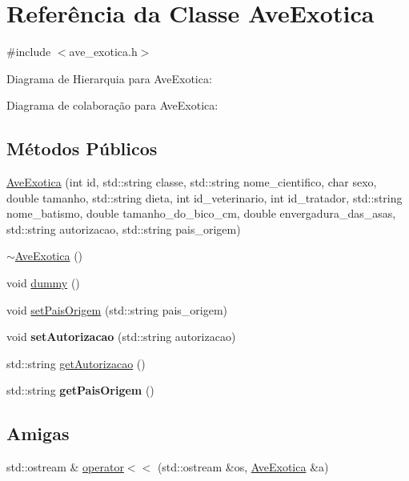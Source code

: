 \hypertarget{classAveExotica}{}\section{Referência da Classe Ave\+Exotica}
\label{classAveExotica}


{\ttfamily \#include $<$ave\+\_\+exotica.\+h$>$}



Diagrama de Hierarquia para Ave\+Exotica\+:


Diagrama de colaboração para Ave\+Exotica\+:
\subsection*{Métodos Públicos}
\begin{DoxyCompactItemize}
\item 
\hyperlink{classAveExotica_a22c3fa1e0a5cf02e6ecc7c04bea8ce97}{Ave\+Exotica} (int id, std\+::string classe, std\+::string nome\+\_\+cientifico, char sexo, double tamanho, std\+::string dieta, int id\+\_\+veterinario, int id\+\_\+tratador, std\+::string nome\+\_\+batismo, double tamanho\+\_\+do\+\_\+bico\+\_\+cm, double envergadura\+\_\+das\+\_\+asas, std\+::string autorizacao, std\+::string pais\+\_\+origem)
\item 
\hyperlink{classAveExotica_a548f328d5fe687e37f96936f0024845e}{$\sim$\+Ave\+Exotica} ()
\item 
void \hyperlink{classAveExotica_add68b24041e28ade517eb42783da81a8}{dummy} ()
\item 
void \hyperlink{classAveExotica_a3e30ad3b8c8904e706072ce845f6a022}{set\+Pais\+Origem} (std\+::string pais\+\_\+origem)
\item 
\mbox{\label{classAveExotica_a6a83bfb65a3733a6d2e6688cbc7ec851}} 
void {\bfseries set\+Autorizacao} (std\+::string autorizacao)
\item 
std\+::string \hyperlink{classAveExotica_acd164f3fa24cfabb458e5a94e056dde8}{get\+Autorizacao} ()
\item 
\mbox{\label{classAveExotica_aedbfd694fccd17bbf6b8b0caa738090d}} 
std\+::string {\bfseries get\+Pais\+Origem} ()
\end{DoxyCompactItemize}
\subsection*{Amigas}
\begin{DoxyCompactItemize}
\item 
std\+::ostream \& \hyperlink{classAveExotica_a767cee77b7786ba8e6c3294697d01f05}{operator$<$$<$} (std\+::ostream \&os, \hyperlink{classAveExotica}{Ave\+Exotica} \&a)
\end{DoxyCompactItemize}
